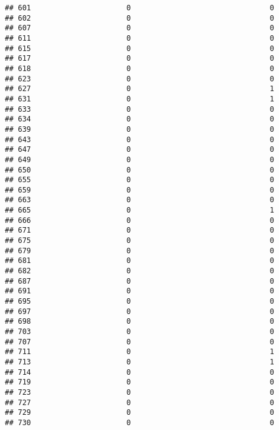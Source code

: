 \documentclass[
]{article}
\begin{document}
\begin{verbatim}
## 601                      0                                0
## 602                      0                                0
## 607                      0                                0
## 611                      0                                0
## 615                      0                                0
## 617                      0                                0
## 618                      0                                0
## 623                      0                                0
## 627                      0                                1
## 631                      0                                1
## 633                      0                                0
## 634                      0                                0
## 639                      0                                0
## 643                      0                                0
## 647                      0                                0
## 649                      0                                0
## 650                      0                                0
## 655                      0                                0
## 659                      0                                0
## 663                      0                                0
## 665                      0                                1
## 666                      0                                0
## 671                      0                                0
## 675                      0                                0
## 679                      0                                0
## 681                      0                                0
## 682                      0                                0
## 687                      0                                0
## 691                      0                                0
## 695                      0                                0
## 697                      0                                0
## 698                      0                                0
## 703                      0                                0
## 707                      0                                0
## 711                      0                                1
## 713                      0                                1
## 714                      0                                0
## 719                      0                                0
## 723                      0                                0
## 727                      0                                0
## 729                      0                                0
## 730                      0                                0

\end{verbatim}
\end{document}
